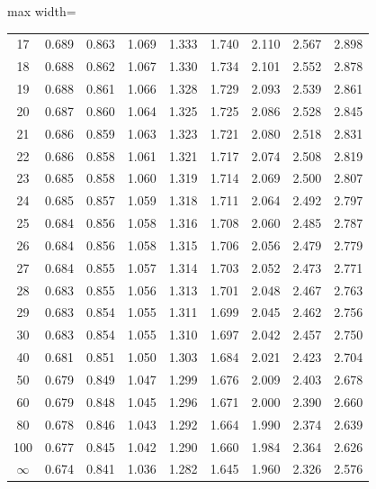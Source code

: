 \begin{center}
\begin{adjustbox}{max width=\linewidth}
\begin{tabular}{ccccccccc}
17 & 0.689 & 0.863 & 1.069 & 1.333 & 1.740 & 2.110 & 2.567 & 2.898 \\
18 & 0.688 & 0.862 & 1.067 & 1.330 & 1.734 & 2.101 & 2.552 & 2.878 \\
19 & 0.688 & 0.861 & 1.066 & 1.328 & 1.729 & 2.093 & 2.539 & 2.861 \\
20 & 0.687 & 0.860 & 1.064 & 1.325 & 1.725 & 2.086 & 2.528 & 2.845 \\
\midrule
21 & 0.686 & 0.859 & 1.063 & 1.323 & 1.721 & 2.080 & 2.518 & 2.831 \\
22 & 0.686 & 0.858 & 1.061 & 1.321 & 1.717 & 2.074 & 2.508 & 2.819 \\
23 & 0.685 & 0.858 & 1.060 & 1.319 & 1.714 & 2.069 & 2.500 & 2.807 \\
24 & 0.685 & 0.857 & 1.059 & 1.318 & 1.711 & 2.064 & 2.492 & 2.797 \\
25 & 0.684 & 0.856 & 1.058 & 1.316 & 1.708 & 2.060 & 2.485 & 2.787 \\
\midrule
26 & 0.684 & 0.856 & 1.058 & 1.315 & 1.706 & 2.056 & 2.479 & 2.779 \\
27 & 0.684 & 0.855 & 1.057 & 1.314 & 1.703 & 2.052 & 2.473 & 2.771 \\
28 & 0.683 & 0.855 & 1.056 & 1.313 & 1.701 & 2.048 & 2.467 & 2.763 \\
29 & 0.683 & 0.854 & 1.055 & 1.311 & 1.699 & 2.045 & 2.462 & 2.756 \\
30 & 0.683 & 0.854 & 1.055 & 1.310 & 1.697 & 2.042 & 2.457 & 2.750 \\
\midrule
40 & 0.681 & 0.851 & 1.050 & 1.303 & 1.684 & 2.021 & 2.423 & 2.704 \\
50 & 0.679 & 0.849 & 1.047 & 1.299 & 1.676 & 2.009 & 2.403 & 2.678 \\
60 & 0.679 & 0.848 & 1.045 & 1.296 & 1.671 & 2.000 & 2.390 & 2.660 \\
80 & 0.678 & 0.846 & 1.043 & 1.292 & 1.664 & 1.990 & 2.374 & 2.639 \\
100 & 0.677 & 0.845 & 1.042 & 1.290 & 1.660 & 1.984 & 2.364 & 2.626 \\
$\infty$ & 0.674 & 0.841 & 1.036 & 1.282 & 1.645 & 1.960 & 2.326 & 2.576 \\
\bottomrule
\end{tabular}
\end{adjustbox}
\end{center}

\clearpage
